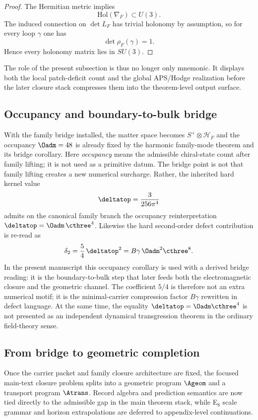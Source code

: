 \begin{proof}
The Hermitian metric implies
\[
\mathrm{Hol}(\nabla_F)\subset U(3).
\]
The induced connection on $\det L_F$ has trivial holonomy by assumption, so for
every loop $\gamma$ one has
\[
\det \rho_F(\gamma)=1.
\]
Hence every holonomy matrix lies in $SU(3)$.
\end{proof}

The role of the present subsection is thus no longer only mnemonic. It displays both the local patch-deficit count and the global APS/Hodge realization before the later closure stack compresses them into the theorem-level output surface.

\subsection{Occupancy and boundary-to-bulk bridge}

With the family bridge installed, the matter space becomes $S^+\otimes \mathcal H_F$ and the
occupancy $\Oadm=48$ is already fixed by the harmonic family-mode theorem and its bridge
corollary. Here \emph{occupancy} means the admissible chiral-state count after family lifting; it
is not used as a primitive datum. The bridge point is not that family lifting creates a new
numerical surcharge. Rather, the inherited hard kernel value
\[
\deltatop=\frac{3}{256\pi^4}
\]
admits on the canonical family branch the occupancy reinterpretation $\deltatop=\Oadm\,\cthree^4$.
Likewise the hard second-order defect contribution is re-read as
\[
\delta_2=\frac54\,\deltatop^2=B\gamma\,\Oadm^2\cthree^8.
\]
In the present manuscript this occupancy corollary is used with a derived bridge reading:
it is the boundary-to-bulk step that later feeds both the electromagnetic closure and the
geometric channel. The coefficient $5/4$ is therefore not an extra numerical motif; it is the
minimal-carrier compression factor $B\gamma$ rewritten in defect language. At the same time, the
equality $\deltatop=\Oadm\cthree^4$ is not presented as an independent dynamical transgression
theorem in the ordinary field-theory sense.

\subsection{From bridge to geometric completion}

\begin{principle}
Once the carrier packet and family closure architecture are fixed, the focused main-text closure
problem splits into a geometric program $\Ageom$ and a transport program $\Atrans$. Record
algebra and prediction semantics are now tied directly to the admissible gap in the main theorem
stack, while E$_8$ scale grammar and horizon extrapolations are deferred to appendix-level
continuations.
\end{principle}

